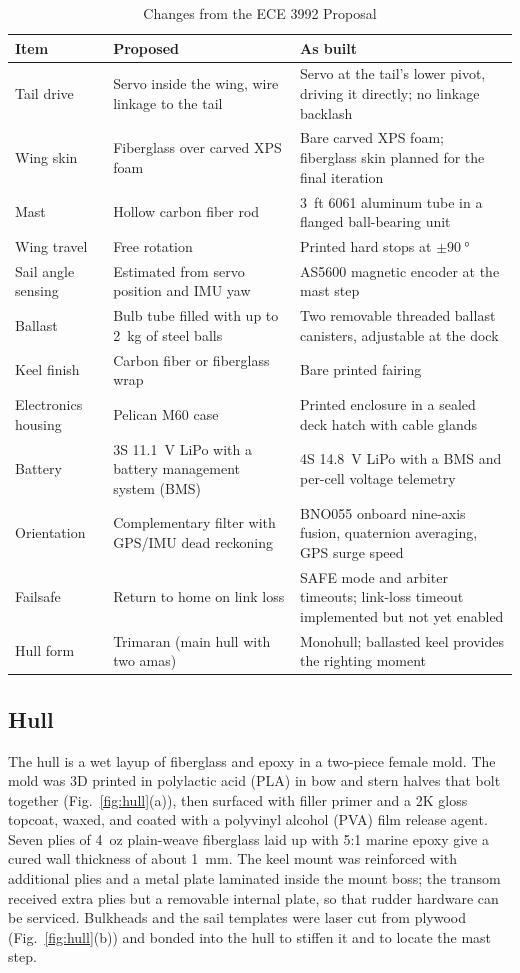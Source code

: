 \begin{table}[!t]
\caption{Changes from the ECE 3992 Proposal}
\label{tab:changes}
\centering
\begin{tabular}{@{}p{}p{}p{}@{}}
\toprule
Item & Proposed & As built \\
\midrule
Tail drive & Servo inside the wing, wire linkage to the tail & Servo at the tail's lower pivot, driving it directly; no linkage backlash \\
Wing skin & Fiberglass over carved XPS foam & Bare carved XPS foam; fiberglass skin planned for the final iteration \\
Mast & Hollow carbon fiber rod & \SI{3}{ft} 6061 aluminum tube in a flanged ball-bearing unit \\
Wing travel & Free rotation & Printed hard stops at $\pm\SI{90}{\degree}$ \\
Sail angle sensing & Estimated from servo position and IMU yaw & AS5600 magnetic encoder at the mast step \\
Ballast & Bulb tube filled with up to \SI{2}{\kilo\gram} of steel balls & Two removable threaded ballast canisters, adjustable at the dock \\
Keel finish & Carbon fiber or fiberglass wrap & Bare printed fairing \\
Electronics housing & Pelican M60 case & Printed enclosure in a sealed deck hatch with cable glands \\
Battery & 3S \SI{11.1}{\volt} LiPo with a battery management system (BMS) & 4S \SI{14.8}{\volt} LiPo with a BMS and per-cell voltage telemetry \\
Orientation & Complementary filter with GPS/IMU dead reckoning & BNO055 onboard nine-axis fusion, quaternion averaging, GPS surge speed \\
Failsafe & Return to home on link loss & SAFE mode and arbiter timeouts; link-loss timeout implemented but not yet enabled \\
Hull form & Trimaran (main hull with two amas) & Monohull; ballasted keel provides the righting moment \\
\bottomrule
\end{tabular}
\end{table}

\subsection{Hull}
The hull is a wet layup of fiberglass and epoxy in a two-piece female mold.
The mold was 3D printed in polylactic acid (PLA) in bow and stern halves that bolt together
(Fig.~\ref{fig:hull}(a)), then surfaced with filler primer and a 2K gloss
topcoat, waxed, and coated with a polyvinyl alcohol (PVA) film release agent. Seven plies of \SI{4}{oz} plain-weave fiberglass
laid up with 5:1 marine epoxy give a cured wall thickness of about
\SI{1}{\milli\meter}. The keel mount was
reinforced with additional plies and a metal plate laminated inside the mount
boss; the transom received extra plies but a removable internal plate, so
that rudder hardware can be serviced. Bulkheads and the sail templates were
laser cut from plywood (Fig.~\ref{fig:hull}(b)) and bonded into the hull to
stiffen it and to locate the mast step.

